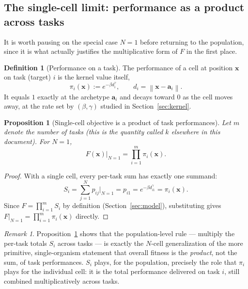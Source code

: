 \documentclass[11pt,a4paper]{article}
\theoremstyle{plain}
\newtheorem{proposition}[theorem]{Proposition}
\theoremstyle{definition}
\newtheorem{definition}[theorem]{Definition}
\theoremstyle{remark}
\newtheorem{remark}[theorem]{Remark}
\newcommand{\bx}{\bm{x}}
\newcommand{\ba}{\bm{a}}
\newcommand{\norm}[1]{\left\lVert #1\right\rVert}
\newcommand{\bw}{\beta}
\begin{document}
\subsection{The single-cell limit: performance as a product across tasks}
\label{sec:single_cell}

It is worth pausing on the special case $N=1$ before returning to the
population, since it is what actually justifies the multiplicative form of
$F$ in the first place.

\begin{definition}[Performance on a task]
The performance of a cell at position $\bx$ on task (target) $i$ is the
kernel value itself,
\begin{equation}
  \boxed{
  \pi_i(\bx):=e^{-\bw d_i^{\gamma}},
  \qquad d_i=\norm{\bx-\ba_i}.
  }
  \label{eq:performance_def}
\end{equation}
It equals $1$ exactly at the archetype $\ba_i$ and decays toward $0$ as the
cell moves away, at the rate set by $(\bw,\gamma)$ studied in
Section~\ref{sec:kernel}.
\end{definition}

\begin{proposition}[Single-cell objective is a product of task performances]
\label{prop:single_cell_product}
Let $m$ denote the number of tasks (this is the quantity called $k$
elsewhere in this document). For $N=1$,
\begin{equation}
  \boxed{
  F(\bx)\Big|_{N=1}=\prod_{i=1}^{m}\pi_i(\bx).
  }
  \label{eq:single_cell_product}
\end{equation}
\end{proposition}
\begin{proof}
With a single cell, every per-task sum has exactly one summand:
\[
  S_i=\sum_{j=1}^{N}p_{ij}\bigg|_{N=1}=p_{i1}=e^{-\bw d_{i1}^{\gamma}}=\pi_i(\bx).
\]
Since $F=\prod_{i=1}^m S_i$ by definition (Section~\ref{sec:model}),
substituting gives $F|_{N=1}=\prod_{i=1}^m\pi_i(\bx)$ directly.
\end{proof}

\begin{remark}
Proposition~\ref{prop:single_cell_product} shows that the population-level
rule — multiply the per-task totals $S_i$ across tasks — is exactly the
$N$-cell generalization of the more primitive, single-organism statement
that overall fitness is the \emph{product}, not the sum, of task
performances. $S_i$ plays, for the population, precisely the role that
$\pi_i$ plays for the individual cell: it is the total performance
delivered on task $i$, still combined multiplicatively across tasks.
\end{remark}
\end{document}
